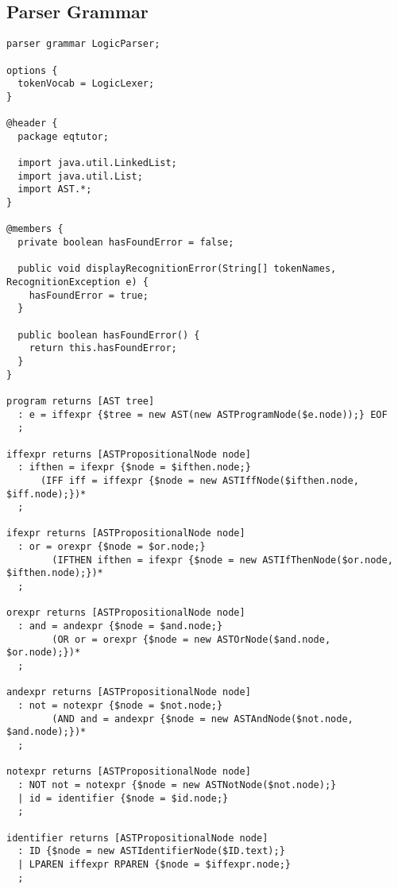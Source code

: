 \documentclass[12pt]{article}
\begin{document}
\newpage

\subsection{Parser Grammar}

\begin{verbatim}
parser grammar LogicParser;

options {
  tokenVocab = LogicLexer;
}

@header {
  package eqtutor;

  import java.util.LinkedList;
  import java.util.List;
  import AST.*;
}

@members {
  private boolean hasFoundError = false;

  public void displayRecognitionError(String[] tokenNames, RecognitionException e) {
    hasFoundError = true;
  }

  public boolean hasFoundError() {
    return this.hasFoundError;
  }
}

program returns [AST tree]
  : e = iffexpr {$tree = new AST(new ASTProgramNode($e.node));} EOF
  ;

iffexpr returns [ASTPropositionalNode node]
  : ifthen = ifexpr {$node = $ifthen.node;} 
	  (IFF iff = iffexpr {$node = new ASTIffNode($ifthen.node, $iff.node);})*
  ;
  	
ifexpr returns [ASTPropositionalNode node]
  : or = orexpr {$node = $or.node;} 
		(IFTHEN ifthen = ifexpr {$node = new ASTIfThenNode($or.node, $ifthen.node);})*
  ;

orexpr returns [ASTPropositionalNode node]
  : and = andexpr {$node = $and.node;} 
		(OR or = orexpr {$node = new ASTOrNode($and.node, $or.node);})*
  ;

andexpr returns [ASTPropositionalNode node]
  : not = notexpr {$node = $not.node;} 
		(AND and = andexpr {$node = new ASTAndNode($not.node, $and.node);})*
  ;

notexpr returns [ASTPropositionalNode node]
  : NOT not = notexpr {$node = new ASTNotNode($not.node);}
  | id = identifier {$node = $id.node;}
  ;

identifier returns [ASTPropositionalNode node]
  : ID {$node = new ASTIdentifierNode($ID.text);}
  | LPAREN iffexpr RPAREN {$node = $iffexpr.node;}
  ;
\end{verbatim}
\end{document}
